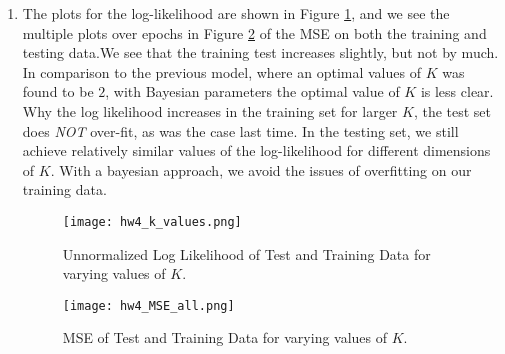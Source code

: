 \documentclass{harvardml}
\theoremstyle{plain}
\begin{document}
\begin{enumerate}
\item
The plots for the log-likelihood are shown in Figure \ref{fig:k_values}, and we see the multiple plots over epochs in Figure \ref{fig:mse_K_values} of the MSE on both the training and testing data.We see that the training test increases slightly, but not by much. In comparison to the previous model, where an optimal values of $K$ was found to be $2$, with Bayesian parameters the optimal value of $K$ is less clear. Why the log likelihood increases in the training set for larger $K$, the test set does \textit{NOT} over-fit, as was the case last time. In the testing set, we still achieve relatively similar values of the log-likelihood for different dimensions of $K$. With a bayesian approach, we avoid the issues of overfitting on our training data.

\begin{figure}[h!]
\centering
\texttt{[image: hw4\_k\_values.png]}
\caption{Unnormalized Log Likelihood of Test and Training Data for varying values of $K$.}
\label{fig:k_values}
\end{figure}

\begin{figure}[h!]
\centering
\texttt{[image: hw4\_MSE\_all.png]}
\caption{MSE of Test and Training Data for varying values of $K$.}
\label{fig:mse_K_values}
\end{figure}
\end{enumerate}
\pagebreak
\end{document}

